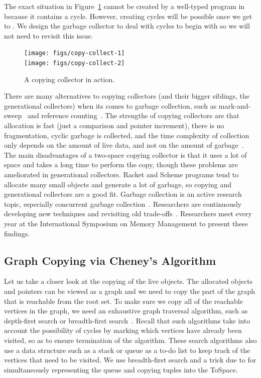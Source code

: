 \documentclass[11pt]{book}
\begin{document}
The exact situation in Figure~\ref{fig:copying-collector} cannot be
created by a well-typed program in \LangVec{} because it contains a
cycle. However, creating cycles will be possible once we get to \LangAny{}.
We design the garbage collector to deal with cycles to begin with so
we will not need to revisit this issue.

\begin{figure}[tbp]
\centering
\texttt{[image: figs/copy-collect-1]} \\[5ex]
\texttt{[image: figs/copy-collect-2]}
\caption{A copying collector in action.}
\label{fig:copying-collector}
\end{figure}

There are many alternatives to copying collectors (and their bigger
siblings, the generational collectors) when its comes to garbage
collection, such as mark-and-sweep~\citep{McCarthy:1960dz} and
reference counting~\citep{Collins:1960aa}.  The strengths of copying
collectors are that allocation is fast (just a comparison and pointer
increment), there is no fragmentation, cyclic garbage is collected,
and the time complexity of collection only depends on the amount of
live data, and not on the amount of garbage~\citep{Wilson:1992fk}. The
main disadvantages of a two-space copying collector is that it uses a
lot of space and takes a long time to perform the copy, though these
problems are ameliorated in generational collectors.  Racket and
Scheme programs tend to allocate many small objects and generate a lot
of garbage, so copying and generational collectors are a good fit.
Garbage collection is an active research topic, especially concurrent
garbage collection~\citep{Tene:2011kx}. Researchers are continuously
developing new techniques and revisiting old
trade-offs~\citep{Blackburn:2004aa,Jones:2011aa,Shahriyar:2013aa,Cutler:2015aa,Shidal:2015aa,Osterlund:2016aa,Jacek:2019aa,Gamari:2020aa}. Researchers
meet every year at the International Symposium on Memory Management to
present these findings.


\subsection{Graph Copying via Cheney's Algorithm}
\label{sec:cheney}
Let us take a closer look at the copying of the live objects. The
allocated objects and pointers can be viewed as a graph and we need to
copy the part of the graph that is reachable from the root set. To
make sure we copy all of the reachable vertices in the graph, we need
an exhaustive graph traversal algorithm, such as depth-first search or
breadth-first search~\citep{Moore:1959aa,Cormen:2001uq}. Recall that
such algorithms take into account the possibility of cycles by marking
which vertices have already been visited, so as to ensure termination
of the algorithm. These search algorithms also use a data structure
such as a stack or queue as a to-do list to keep track of the vertices
that need to be visited. We use breadth-first search and a trick
due to \citet{Cheney:1970aa} for simultaneously representing the queue
and copying tuples into the ToSpace.
\end{document}
